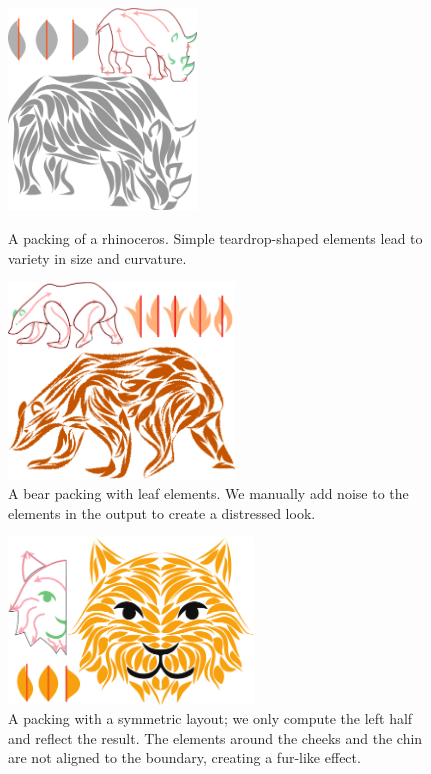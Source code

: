 \begin{figure}[t!]
\centering
\includegraphics[width=5cm]{figures/flowpak/result_02.pdf} %
\caption[A packing of a rhinoceros]
{\label{result_rhino}
A packing of a rhinoceros.  Simple teardrop-shaped 
elements lead to variety in size and curvature.}
\bigskip
\includegraphics[width=6cm]{figures/flowpak/bear_leaves.pdf} %
\caption[A packing of a bear with leaf elements]
{\label{result_bear_leaves}
	A bear packing with leaf elements.  We manually add noise to the 
	elements in the output to create a distressed look.}
\end{figure}

\begin{figure} %
\centering
\includegraphics[width=6.5cm]{figures/flowpak/cat.pdf}
\caption[A packing of a cat]
{A packing with a symmetric layout; we only compute the left half and reflect the result. The elements around the cheeks and the chin are not aligned to the boundary, creating a fur-like effect.}
\label{result_cat}
\end{figure}


